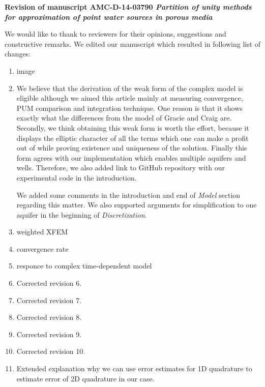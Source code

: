 \documentclass[a4paper,11pt]{article}
\begin{document}
{
\begin{center}
{\Large\bf Revision of manuscript AMC-D-14-03790 
\newline
\newline
\emph{Partition of unity methods for approximation of point water sources in porous media}}
\end{center}
}

We would like to thank to reviewers for their opinions, suggestions and constructive remarks.
We edited our manuscript which resulted in following list of changes:

\begin{enumerate}
\item image %
\item %
      We believe that the derivation of the weak form of the complex model is eligible
      although we aimed this article mainly at measuring convergence, PUM comparison and integration technique.
      One reason is that it shows exactly what the differences from the model of Gracie and Craig are.
      Secondly, we think obtaining this weak form is worth the effort, because it displays the elliptic
      character of all the terms which one can make a profit out of while proving existence and uniqueness of the solution.
      Finally this form agrees with our implementation which enables multiple aquifers and wells.
      Therefore, we also added link to GitHub repository with our experimental code in the introduction.
      
      We added some comments in the introduction and end of \emph{Model} section regarding this matter.
      We also supported arguments for simplification to one aquifer in the beginning of \emph{Discretization}.
\item weighted XFEM %
\item convergence rate %
\item responce to complex time-dependent model %

\item Corrected revision 6. %
\item Corrected revision 7. %
\item Corrected revision 8. %
\item Corrected revision 9. %
\item Corrected revision 10. %

\item Extended explanation why we can use error estimates for 1D quadrature to estimate error of 2D quadrature in our case. %


\end{enumerate}
\end{document}
